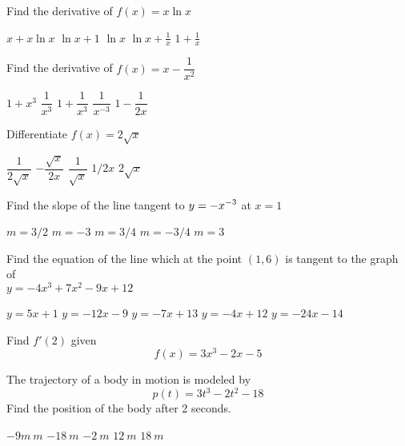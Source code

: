 \documentclass[legalpaper, 12pt, addpoints]{exam}
\begin{document}
\begin{questions}
 \question Find the derivative of \(f(x) = x\ln{x}\)
\begin{choices}
	\choice \(x+x\ln{x}\)
	\CorrectChoice \(\ln{x} + 1\)
	\choice \(\ln{x}\)
	\choice \(\ln{x} + \frac{1}{x}\)
	\choice \(1 + \frac{1}{x}\)
\end{choices}

\question Find the derivative of  $f(x)=x -\dfrac{1}{x^{2}}$
	\begin{choices}
		\choice $1 + x^{3}$
		\choice $\dfrac{1}{x^{3}}$
		\CorrectChoice $1 + \dfrac{1}{x^{3}}$
		\choice $ \dfrac{1}{x^{-3}}$
		\choice $1-\dfrac{1}{2x}$
	\end{choices}

\question Differentiate $ f(x) =  2\sqrt{x}  $
	\begin{choices}
		\choice  $\dfrac{1}{2\sqrt{x}}$
		\choice $-\dfrac{\sqrt{x}}{2x}$
		\CorrectChoice $\dfrac{1}{\sqrt{x}}$
		\choice  $1/{2x}$
		\choice $2\sqrt{x}$
	\end{choices}

\question Find the slope of the line tangent to  $ \displaystyle \small y =-x^{-3}$ at $x=1$
            \begin{choices}
            \choice $m = 3/2$
            \choice $m = -3$
            \choice $m = 3/4$
            \choice  $m = -3/4$
            \CorrectChoice $m =3$
            \end{choices}

\question Find the equation of the line which at the point $(1,6)$ is tangent to the graph of\\ \(\displaystyle y=-4x^3+7x^2-9x+12\)
     \begin{choices}
            \choice $y=5x+1$
            \choice $y=-12x -9$
            \CorrectChoice $y=-7x+13$
            \choice $y=-4x+12$
            \choice $y=-24x-14$
     \end{choices}
\vspace{0.2in}
\question Find  $f'(2)$ given  $$f(x) = 3x^3 - 2x- 5$$
\begin{choices}
\end{choices}
\vspace{0.1in}

\question The trajectory of a body in motion is modeled by $$p(t) = 3t^3 - 2t^2 -18$$ Find the position of the body after 2 seconds.
\begin{choices}
	\choice $-9m \ m$
	\choice $-18 \ m$ 
	\CorrectChoice $-2 \ m$
	\choice $12 \ m$ 
	\choice $18 \ m$
\end{choices}
\vspace{0.2in}


\end{questions}
\end{document}
